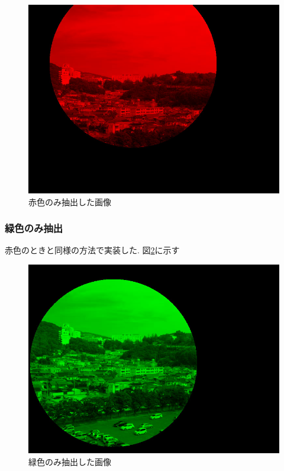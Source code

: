 \documentclass[11pt]{jarticle}
\begin{document}
\begin{figure}[htbp]
    \centering
    \includegraphics[scale=.2]{red.jpg}
    \caption{赤色のみ抽出した画像}
    \label{red.jpg}
\end{figure}

\subsubsection{緑色のみ抽出}
赤色のときと同様の方法で実装した.
図\ref{b.jpg}に示す

\begin{figure}[htbp]
    \centering
    \includegraphics[scale=.2]{b.jpg}
    \caption{緑色のみ抽出した画像}
    \label{b.jpg}
\end{figure}
\end{document}
